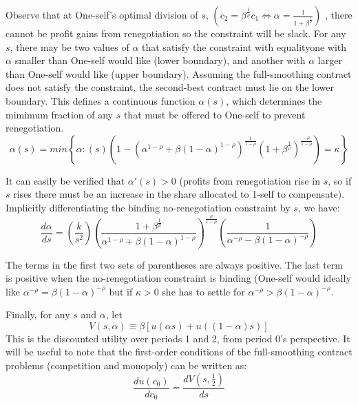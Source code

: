 \documentclass[11pt,english]{article}
\theoremstyle{plain}
\theoremstyle{definition}
\begin{document}
Observe that at One-self's optimal division of $s$, $\left(c_{2}=\beta^{\frac{1}{\rho}}c_{1}\Longleftrightarrow\alpha=\frac{1}{1+\beta^{\frac{1}{\rho}}}\right)$
, there cannot be profit gains from renegotiation so the constraint
will be slack. For any $s$, there may be two values of $\alpha$
that satisfy the constraint with equality\textendash one with $\alpha$
smaller than One-self would like (lower boundary), and another with
$\alpha$ larger than One-self would like (upper boundary). Assuming
the full-smoothing contract does not satisfy the constraint, the second-best
contract must lie on the lower boundary. This defines a continuous
function $\alpha\left(s\right)$, which determines the mimimum fraction
of any $s$ that must be offered to One-self to prevent renegotiation.
\begin{equation}
\alpha\left(s\right)=min\left\{ \alpha:\left(s\right)\left(1-\left(\alpha^{1-\rho}+\beta\left(1-\alpha\right)^{1-\rho}\right)^{\frac{1}{1-\rho}}\left(1+\beta^{\frac{1}{\rho}}\right)^{\frac{-\rho}{1-\rho}}\right)=\kappa\right\} \label{eq:alpha-1}
\end{equation}

It can easily be verified that $\alpha'\left(s\right)>0$ (profits
from renegotiation rise in $s$, so if $s$ rises there must be an
increase in the share allocated to 1-self to compensate). Implicitly
differentiating the binding no-renegotiation constraint by $s$, we
have:
\begin{equation}
\frac{d\alpha}{ds}=\left(\frac{k}{s^{2}}\right)\left(\frac{1+\beta^{\frac{1}{\rho}}}{\alpha^{1-\rho}+\beta\left(1-\alpha\right)^{1-\rho}}\right)^{\frac{\rho}{1-\rho}}\left(\frac{1}{\alpha^{-\rho}-\beta\left(1-\alpha\right)^{-\rho}}\right)\label{eq:dalpha-ds}
\end{equation}

The terms in the first two sets of parentheses are always positive.
The last term is positive when the no-renegotiation constraint is
binding (One-self would ideally like $\alpha^{-\rho}=\beta\left(1-\alpha\right)^{-\rho}$
but if $\kappa>0$ she has to settle for $\alpha^{-\rho}>\beta\left(1-\alpha\right)^{-\rho}$.

Finally, for any $s$ and $\alpha$, let 
\begin{equation}
V\left(s,\alpha\right)\equiv\beta\left[u\left(\alpha s\right)+u\left(\left(1-\alpha\right)s\right)\right]\label{eq:cont-utility}
\end{equation}
 This is the discounted utility over periods 1 and 2, from period
0's perspective. It will be useful to note that the first-order conditions
of the full-smoothing contract problems (competition and monopoly)
can be written as:
\begin{equation}
\frac{du\left(c_{0}\right)}{dc_{0}}=\frac{dV\left(s,\frac{1}{2}\right)}{ds}\label{eq:FOC-with-V}
\end{equation}
\end{document}
